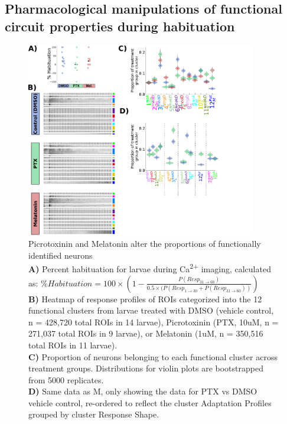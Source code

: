 \documentclass[9pt,lineno]{RandlettLab_elife}
\begin{document}
\subsection{Pharmacological manipulations of functional circuit properties during habituation}

\begin{figure}
\begin{center}
\includegraphics[width=0.9\textwidth]{Figure6 - Ca2+ImagingDrugs.png}
\caption{
Picrotoxinin and Melatonin alter the proportions of functionally identified neurons
\\ \textbf{A)} Percent habituation for larvae during Ca\textsuperscript{2+} imaging, calculated as:
$\% Habituation = 
100 \times (1 - \frac{P(Resp_{31\rightarrow60})}{0.5 \times (P(Resp_{1\rightarrow30} + P(Resp_{31\rightarrow60}))})$
\\ \textbf{B)} Heatmap of response profiles of ROIs categorized into the 12 functional clusters from larvae treated with DMSO (vehicle control, n = 428,720 total ROIs in 14 larvae), Picrotoxinin (PTX, 10uM, n = 271,037 total ROIs in 9 larvae), or Melatonin (1uM, n = 350,516 total ROIs in 11 larvae).
\\ \textbf{C)} Proportion of neurons belonging to each functional cluster across treatment groups. Distributions for violin plots are bootstrapped from 5000 replicates. 
\\ \textbf{D)} Same data as M, only showing the data for PTX vs DMSO vehicle control, re-ordered to reflect the cluster Adaptation Profiles grouped by cluster Response Shape. 
}


\end{center}
\end{figure}
\end{document}
